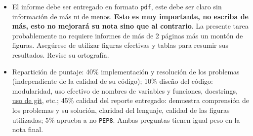 \documentclass[letter, 11pt]{article}
\begin{document}
\begin{itemize}
\item El informe debe ser entregado en formato \texttt{pdf}, este debe ser
  claro sin información de más ni de menos. \textbf{Esto es muy importante, no
  escriba de más, esto no mejorará su nota sino que al contrario}. La presente
  tarea probablemente no requiere informes de más de 2 páginas más un montón de
  figuras.  Asegúrese de utilizar figuras efectivas y tablas para resumir sus
  resultados. Revise su ortografía.

 \item Repartición de puntaje: 40\% implementación y resolución de los
   problemas (independiente de la calidad de su código); 10\% diseño del
   código: modularidad, uso efectivo de nombres de variables y funciones,
   docstrings, \underline{uso de git}, etc.; 45\% calidad del reporte
   entregado: demuestra comprensión de los problemas y su solución, claridad
   del lenguaje, calidad de las figuras utilizadas; 5\% aprueba a no
   \texttt{PEP8}. Ambas preguntas tienen igual peso en la nota final.


\end{itemize}

\end{document}
